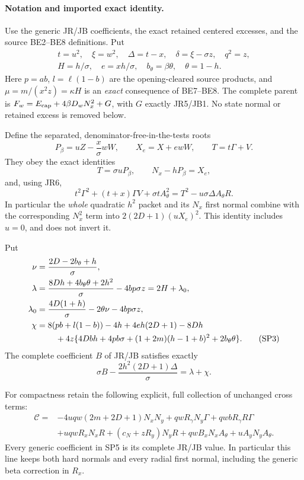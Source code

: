 \paragraph{Notation and imported exact identity.}
Use the generic JR/JB coefficients, the exact retained centered excesses,
and the source BE2--BE8 definitions. Put
\[
\begin{gathered}
 t=u^2,\quad \xi=w^2,\quad \Delta=t-x,\quad
 \delta=\xi-\sigma z,\quad q^2=z,\\
 H=h/\sigma,\quad e=xh/\sigma,\quad b_\theta=\beta\theta,
 \quad\theta=1-h.
\end{gathered}
\]
Here $p=ab$, $l=\ell(1-b)$ are the opening-cleared source products,
and $\mu=m/(x^2z)=\kappa H$ is an \emph{exact} consequence of BE7--BE8.
The complete parent is
$F_w=E_{\rm cap}+4\beta D_wN_x^2+G$, with $G$ exactly JR5/JB1.
No state normal or retained excess is removed below.

Define the separated, denominator-free-in-the-tests roots
\[
 P_\beta=uZ-\frac{x}{\sigma}wW,\qquad
 X_e=X+ewW,\qquad T=t\Gamma+V.
\]
They obey the exact identities
\[
 T=\sigma uP_\beta,\qquad N_x-hP_\beta=X_e,
 \tag{SP1}
\]
and, using JR6,
\[
 t^2\Gamma^2+(t+x)\Gamma V+\sigma tA_\theta^2
 =T^2-u\sigma\Delta A_\theta R.
 \tag{SP2}
\]
In particular the \emph{whole} quadratic $h^2$ packet and its
$N_x$ first normal combine with the corresponding $N_x^2$ term into
$2(2D+1)(uX_e)^2$. This identity includes $u=0$, and does not invert it.

Put
\begin{align*}
 \nu&=\frac{2D-2b_\theta+h}{\sigma},\\
 \lambda&=\frac{8Dh+4b_\theta\theta+2h^2}{\sigma}
                    -4bp\sigma z=2H+\lambda_0,\\
 \lambda_0&=\frac{4D(1+h)}{\sigma}-2\theta\nu-4bp\sigma z,\\
 \chi&=8(pb+l(1-b))-4h+4eh(2D+1)-8Dh\\
 &\hspace{8mm}+4z\{4Dbh+4pb\sigma+(1+2m)(h-1+b)^2
                                      +2b_\theta\theta\}.
 \tag{SP3}
\end{align*}
The complete coefficient $B$ of JR/JB satisfies exactly
\[
 \sigma B-\frac{2h^2(2D+1)\Delta}{\sigma}=\lambda+\chi.
 \tag{SP4}
\]

For compactness retain the following explicit, full collection of
unchanged cross terms:
\begin{align*}
 \mathscr C={}&-4uqw(2m+2D+1)N_xN_y
 +qwR_\gamma N_y\Gamma+qwbR_\gamma R\Gamma\\
 &+uqwR_xN_xR+(c_N+zR_y)N_yR
 +qwB_xN_xA_\theta+uA_yN_yA_\theta.
 \tag{SP5}
\end{align*}
Every generic coefficient in SP5 is its complete JR/JB value. In
particular this line keeps both hard normals and every radial first
normal, including the generic beta correction in $R_x$.

